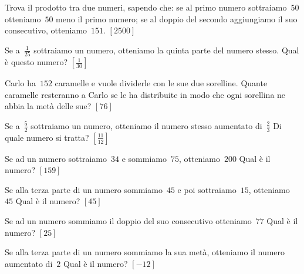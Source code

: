 \begin{multicols}{2}
\begin{esercizio}[\Ast]
\label{ese:14.7}
Trova il prodotto tra due numeri, sapendo che: se al primo numero 
sottraiamo~\(50\) otteniamo~\(50\) meno il primo numero; se al doppio del secondo 
aggiungiamo il suo consecutivo, otteniamo~\(151\). \hfill \(\left[2500\right]\)
\end{esercizio}

\begin{esercizio}[\Ast]
\label{ese:14.8}
Se a~\(\frac{1}{25}\) sottraiamo un numero, otteniamo la quinta parte del numero 
stesso. Qual è questo numero? \hfill \(\left[\frac{1}{30}\right]\)
\end{esercizio}

\begin{esercizio}[\Ast]
\label{ese:14.9}
Carlo ha~\(152\) caramelle e vuole dividerle con le sue due sorelline. Quante 
caramelle resteranno a Carlo se le ha distribuite in modo che ogni sorellina ne 
abbia la metà delle sue? \hfill \(\left[76\right]\)
\end{esercizio}

\begin{esercizio}[\Ast]
\label{ese:14.10}
Se a~\(\frac{5}{2}\) sottraiamo un numero, otteniamo il numero stesso aumentato 
di~\(\frac{2}{3}\) Di quale numero si tratta? \hfill \(\left[\frac{11}{12}\right]\)
\end{esercizio}

\begin{esercizio}[\Ast]
\label{ese:14.11}
Se ad un numero sottraiamo~\(34\) e sommiamo~\(75\), otteniamo~\(200\) Qual è il 
numero? \hfill \(\left[159\right]\)
\end{esercizio}

\begin{esercizio}[\Ast]
\label{ese:14.12}
Se alla terza parte di un numero sommiamo~\(45\) e poi sottraiamo~\(15\), 
otteniamo~\(45\) Qual è il numero? \hfill \(\left[45\right]\)
\end{esercizio}

\begin{esercizio}[\Ast]
\label{ese:14.13}
Se ad un numero sommiamo il doppio del suo consecutivo otteniamo~\(77\) Qual è il 
numero? \hfill \(\left[25\right]\)
\end{esercizio}

\begin{esercizio}[\Ast]
\label{ese:14.14}
Se alla terza parte di un numero sommiamo la sua metà, otteniamo il numero 
aumentato di~\(2\) Qual è il numero? \hfill \(\left[-12\right]\)
\end{esercizio}


\end{multicols}
